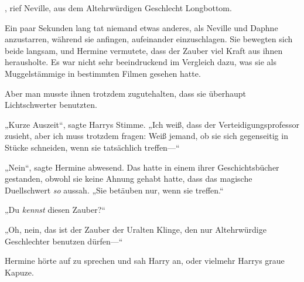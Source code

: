 , rief Neville, aus dem Altehrwürdigen Geschlecht Longbottom. 

\later

Ein paar Sekunden lang tat niemand etwas anderes, als Neville und Daphne anzustarren, während sie anfingen, aufeinander einzuschlagen. Sie bewegten sich beide langsam, und Hermine vermutete, dass der Zauber viel Kraft aus ihnen herausholte. Es war nicht sehr beeindruckend im Vergleich dazu, was sie als Muggelstämmige in bestimmten Filmen gesehen hatte.

Aber man musste ihnen trotzdem zugutehalten, dass sie überhaupt Lichtschwerter benutzten.

„Kurze Auszeit“, sagte Harrys Stimme. „Ich weiß, dass der Verteidigungsprofessor zusieht, aber ich muss trotzdem fragen: Weiß jemand, ob sie sich gegenseitig in Stücke schneiden, wenn sie tatsächlich treffen—“

„Nein“, sagte Hermine abwesend. Das hatte in einem ihrer Geschichtsbücher gestanden, obwohl sie keine Ahnung gehabt hatte, dass das magische Duellschwert \emph{so} aussah. „Sie betäuben nur, wenn sie treffen.“

„Du \emph{kennst} diesen Zauber?“

„Oh, nein, das ist der Zauber der Uralten Klinge, den nur Altehrwürdige Geschlechter benutzen dürfen—“

Hermine hörte auf zu sprechen und sah Harry an, oder vielmehr Harrys graue Kapuze.

